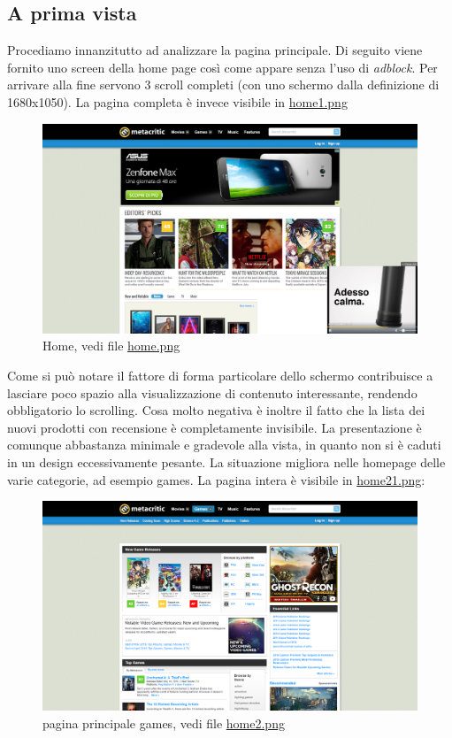 \documentclass[12pt]{article}
\begin{document}
\subsection{A prima vista}
Procediamo innanzitutto ad analizzare la pagina principale. Di seguito viene fornito uno screen della home page così come appare senza l'uso di \textit{adblock}. Per arrivare alla fine servono 3 scroll completi (con uno schermo dalla definizione di 1680x1050). La pagina completa è invece visibile in \href{home1.png}{home1.png}
\begin{figure}[H]
\begin{center}
\includegraphics[width=13.5cm]{home.png}
\caption{Home, vedi file \href{home.png}{home.png}}
\end{center}
\end{figure}
Come si può notare il fattore di forma particolare dello schermo contribuisce a lasciare poco spazio alla visualizzazione di contenuto interessante, rendendo obbligatorio lo scrolling. Cosa molto negativa è inoltre il fatto che la lista dei nuovi prodotti con recensione è completamente invisibile.
La presentazione è comunque abbastanza minimale e gradevole alla vista, in quanto non si è caduti in un design eccessivamente pesante.
La situazione migliora nelle homepage delle varie categorie, ad esempio games. La pagina intera è visibile in \href{home21.png}{home21.png}:
\begin{figure}[H]
	\begin{center}
		\includegraphics[width=13.5cm]{home2.png}
		\caption{pagina principale games, vedi file \href{home2.png}{home2.png}}
	\end{center}
\end{figure}
\end{document}
